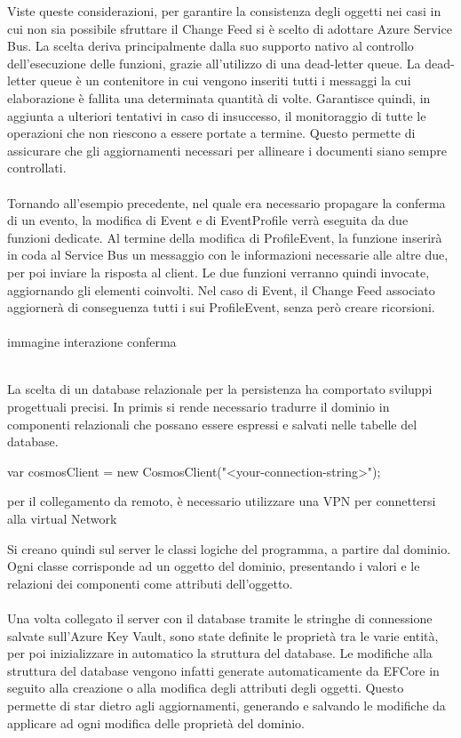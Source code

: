 Viste queste considerazioni, 
per garantire la consistenza degli oggetti nei casi in cui non sia possibile sfruttare il Change Feed
si è scelto di adottare Azure Service Bus.
La scelta deriva principalmente dalla suo supporto nativo al controllo dell'esecuzione delle funzioni,
grazie all'utilizzo di una dead-letter queue.
La dead-letter queue è un contenitore in cui vengono inseriti 
tutti i messaggi la cui elaborazione è fallita una determinata quantità di volte.
Garantisce quindi, in aggiunta a ulteriori tentativi in caso di insuccesso, 
il monitoraggio di tutte le operazioni che non riescono a essere portate a termine.
Questo permette di assicurare che gli aggiornamenti necessari per allineare i documenti
siano sempre controllati.\\
\\
Tornando all'esempio precedente, 
nel quale era necessario propagare la conferma di un evento, 
la modifica di Event e di EventProfile verrà eseguita da due funzioni dedicate.
Al termine della modifica di ProfileEvent, 
la funzione inserirà in coda al Service Bus un messaggio 
con le informazioni necessarie alle altre due,
per poi inviare la risposta al client.
Le due funzioni verranno quindi invocate, 
aggiornando gli elementi coinvolti.
Nel caso di Event, il Change Feed associato aggiornerà di conseguenza 
tutti i sui ProfileEvent, senza però creare ricorsioni.\\
\\
immagine interazione conferma\\
\\





\clearpage




La scelta di un database relazionale per la persistenza ha comportato sviluppi progettuali precisi.
In primis si rende necessario tradurre il dominio in componenti relazionali che possano essere espressi e salvati nelle tabelle del database.

var cosmosClient = new CosmosClient("<your-connection-string>");

per il collegamento da remoto, è necessario utilizzare una VPN per connettersi alla virtual Network

Si creano quindi sul server le classi logiche del programma, a partire dal dominio.
Ogni classe corrisponde ad un oggetto del dominio, presentando i valori e le relazioni dei componenti come attributi dell’oggetto.\\
\\
Una volta collegato il server con il database tramite le stringhe di connessione salvate sull’Azure Key Vault,
sono state definite le proprietà tra le varie entità, per poi inizializzare in automatico la struttura del database.
Le modifiche alla struttura del database vengono infatti generate automaticamente da EFCore in seguito alla creazione o alla modifica degli attributi degli oggetti.
Questo permette di star dietro agli aggiornamenti, generando e salvando le modifiche da applicare ad ogni modifica delle proprietà del dominio.\\
\\


